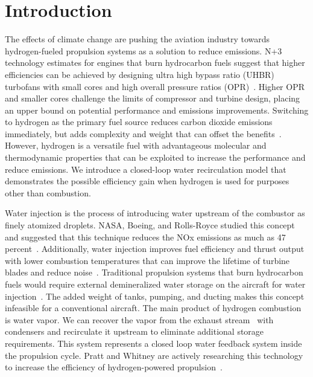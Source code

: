\documentclass[conf]{new-aiaa}
\begin{document}
\section{Introduction}
The effects of climate change are pushing the aviation industry towards hydrogen-fueled propulsion systems as a solution to reduce emissions.
N+3 technology estimates for engines that burn hydrocarbon fuels suggest that higher efficiencies can be achieved by designing ultra high bypass ratio (UHBR) turbofans with small cores and high overall pressure ratios (OPR)~\cite{Jones2017a}.
Higher OPR and smaller cores challenge the limits of compressor and turbine design, placing an upper bound on potential performance and emissions improvements.
Switching to hydrogen as the primary fuel source reduces carbon dioxide emissions immediately, but adds complexity and weight that can offset the benefits~\cite{Adler2023}.
However, hydrogen is a versatile fuel with advantageous molecular and thermodynamic properties that can be exploited to increase the performance and reduce emissions.
We introduce a closed-loop water recirculation model that demonstrates the possible efficiency gain when hydrogen is used for purposes other than combustion.

Water injection is the process of introducing water upstream of the combustor as finely atomized droplets.
NASA, Boeing, and Rolls-Royce studied this concept and suggested that this technique reduces the NOx emissions as much as 47 percent~\cite{Daggett2010}.
Additionally, water injection improves fuel efficiency and thrust output with lower combustion temperatures that can improve the lifetime of turbine blades and reduce noise~\cite{Daggett2010}.
Traditional propulsion systems that burn hydrocarbon fuels would require external demineralized water storage on the aircraft for water injection~\cite{Mourouzidis2015}.
The added weight of tanks, pumping, and ducting makes this concept infeasible for a conventional aircraft.
The main product of hydrogen combustion is water vapor.
We can recover the vapor from the exhaust stream~\cite{Strom2002} with condensers and recirculate it upstream to eliminate additional storage requirements.
This system represents a closed loop water feedback system inside the propulsion cycle.
Pratt and Whitney are actively researching this technology to increase the efficiency of hydrogen-powered propulsion~\cite{arpa-e_2021}.
\end{document}
